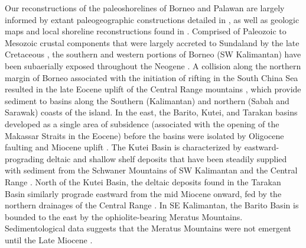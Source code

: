 \documentclass[11pt,letterpaper]{article}
\begin{document}
Our reconstructions of the paleoshorelines of Borneo and Palawan are largely informed by extant paleogeographic constructions detailed in \citet{Hall2001a, Hall2013a, Hall2013b}, as well as geologic maps and local shoreline reconstructions found in \citet{vandeWeerd1992a, Witts2012a, Madon2013a, Kessler2015a}. Comprised of Paleozoic to Mesozoic crustal components that were largely accreted to Sundaland by the late Cretaceous \citep{Metcalfe2013a}, the southern and western portions of Borneo (SW Kalimantan) have been subaerially exposed throughout the Neogene \citep{Hall2013a, Hall2013b}. A collision along the northern margin of Borneo associated with the initiation of rifting in the South China Sea resulted in the late Eocene uplift of the Central Range mountains \citep{Hutchison1996a}, which provide sediment to basins along the Southern (Kalimantan) and northern (Sabah and Sarawak) coasts of the island. In the east, the Barito, Kutei, and Tarakan basins developed as a single area of subsidence (associated with the opening of the Makassar Straits in the Eocene) before the basins were isolated by Oligocene faulting and Miocene uplift \citep{Witts2012a}. The Kutei Basin is characterized by eastward-prograding deltaic and shallow shelf deposits that have been steadily supplied with sediment from the Schwaner Mountains of SW Kalimantan and the Central Range \citep{vandeWeerd1992a}. North of the Kutei Basin, the deltaic deposits found in the Tarakan Basin similarly prograde eastward from the mid Miocene onward, fed by the northern drainages of the Central Range \citep{Satyana1999a}. In SE Kalimantan, the Barito Basin is bounded to the east by the ophiolite-bearing Meratus Mountains. Sedimentological data suggests that the Meratus Mountains were not emergent until the Late Miocene \citep{Witts2012a}.
\end{document}

